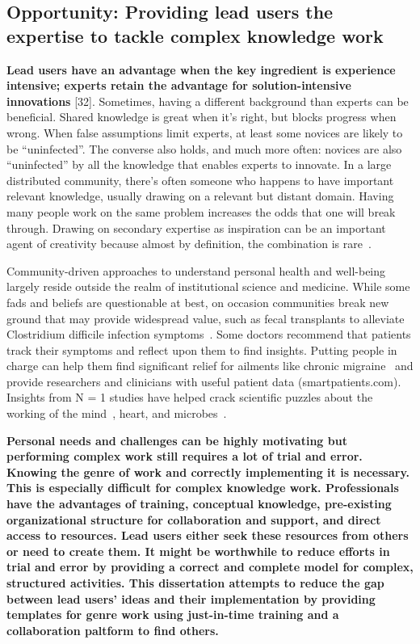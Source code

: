 \subsection{Opportunity: Providing lead users the expertise to tackle complex knowledge work}
\textbf{Lead users have an advantage when the key ingredient is experience intensive; experts retain the
advantage for solution-intensive innovations} [32].  Sometimes, having a different background
 than experts can be beneficial. Shared knowledge is great when it’s right, but blocks progress
 when wrong. When false assumptions limit experts, at least some novices are likely to be 
“uninfected”. The converse also holds, and much more often: novices are also “uninfected” 
by all the knowledge that enables experts to innovate. In a large distributed community, 
there’s often someone who happens to have important relevant knowledge, usually 
drawing on a relevant but distant domain. Having many people work on the same problem 
increases the odds that one will break through. Drawing on secondary expertise as 
inspiration can be an important agent of creativity because almost by definition, the
 combination is rare~\cite{Boden2004}. 

Community-driven approaches to understand personal
health and well-being largely reside outside the realm
of institutional science and medicine. While some fads and beliefs are 
questionable at best, on occasion communities
break new ground that may provide widespread value,
such as fecal transplants to alleviate Clostridium difficile infection
symptoms~\cite{Brandt2012}. Some doctors recommend that patients
track their symptoms and reflect upon them to find
insights. Putting people in charge can help them find significant
relief for ailments like chronic migraine~\cite{Gawande2017} and provide
researchers and clinicians with useful patient data
(smartpatients.com). Insights from N = 1 studies have helped
crack scientific puzzles about the working of the mind~\cite{V.S.Ramachandran1998},
heart, and microbes~\cite{Weisse2012}. 

\textbf{Personal needs and challenges can be highly motivating but performing complex work still requires a lot of trial and error. 
Knowing the genre of work and correctly implementing it is necessary. This is especially difficult for complex knowledge work.
Professionals have the advantages of training, conceptual knowledge, pre-existing organizational structure for 
collaboration and support, and direct access to resources. Lead users either seek these resources from others or need to create them. 
It might be worthwhile to reduce efforts in trial and error by providing a correct and complete model for complex, structured activities.
This dissertation attempts to reduce the gap between lead users' ideas and their implementation by providing templates for 
genre work using just-in-time training and a collaboration paltform to find others.}

